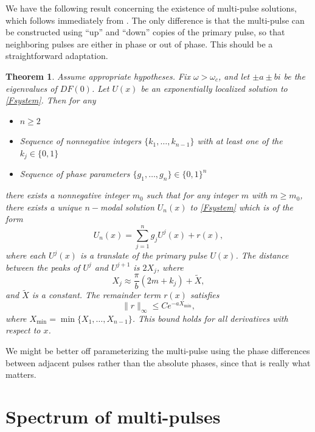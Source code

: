 \documentclass[12pt]{article}
\newtheorem{theorem}{Theorem}
\begin{document}
We have the following result concerning the existence of multi-pulse solutions, which follows immediately from \cite[Theorem~3.6]{SandstedeStrut}. The only difference is that the multi-pulse can be constructed using ``up'' and ``down'' copies of the primary pulse, so that neighboring pulses are either in phase or out of phase. This should be a straightforward adaptation.

\begin{theorem}\label{theorem:multiexist}
Assume appropriate hypotheses. Fix $\omega > \omega_c$, and let $\pm a \pm bi$ be the eigenvalues of $DF(0)$. Let $U(x)$ be an exponentially localized solution to \cref{Fsystem}. Then for any 
\begin{itemize}
\item $n \geq 2$
\item Sequence of nonnegative integers $\{ k_1, \dots, k_{n-1} \}$ with at least one of the $k_j \in \{0, 1 \}$
\item Sequence of phase parameters $\{ g_1, \dots, g_{n} \} \in \{0, 1\}^n$
\end{itemize}
there exists a nonnegative integer $m_0$ such that for any integer $m$ with $m \geq m_0$, there exists a unique $n-$modal solution $U_n(x)$ to \cref{Fsystem} which is of the form
  \begin{equation}\label{qn}
  U_n(x) = \sum_{j = 1}^{n} g_j U^j(x) + r(x),
  \end{equation}
  where each $U^j(x)$ is a translate of the primary pulse $U(x)$. The distance between the peaks of $U^j$ and $U^{j+1}$ is $2 X_j$, where
  \begin{equation*}
  X_j \approx \frac{\pi}{b}(2 m + k_j) + \tilde{X},
  \end{equation*}
  and $\tilde{X}$ is a constant. The remainder term $r(x)$ satisfies
  \begin{equation}\label{rbound}
  \|r\|_\infty \leq C e^{-a X_{\mathrm{min}}},
  \end{equation}
  where $X_{\mathrm{min}} = \min\{X_1, \dots, X_{n-1}\}$. This bound holds for all derivatives with respect to $x$.
\end{theorem}

We might be better off parameterizing the multi-pulse using the phase differences between adjacent pulses rather than the absolute phases, since that is really what matters.

\section{Spectrum of multi-pulses}
\end{document}

